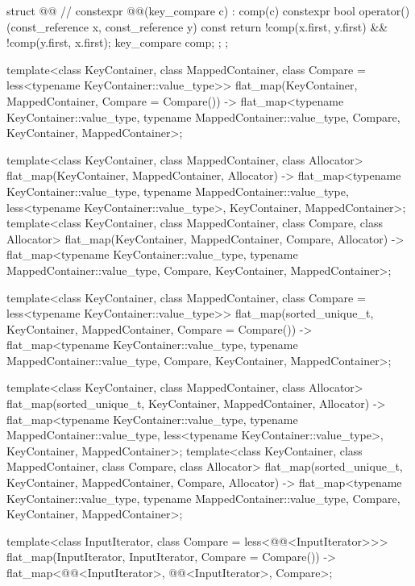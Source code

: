 \begin{codeblock}
{{    struct @@ {  // \expos
      constexpr @@(key_compare c) : comp(c) { }
      constexpr bool operator()(const_reference x, const_reference y) const {
        return !comp(x.first, y.first) && !comp(y.first, x.first);
      }
      key_compare comp;
    };
  };

  template<class KeyContainer, class MappedContainer,
           class Compare = less<typename KeyContainer::value_type>>
    flat_map(KeyContainer, MappedContainer, Compare = Compare())
      -> flat_map<typename KeyContainer::value_type, typename MappedContainer::value_type,
                  Compare, KeyContainer, MappedContainer>;

  template<class KeyContainer, class MappedContainer, class Allocator>
    flat_map(KeyContainer, MappedContainer, Allocator)
      -> flat_map<typename KeyContainer::value_type, typename MappedContainer::value_type,
                  less<typename KeyContainer::value_type>, KeyContainer, MappedContainer>;
  template<class KeyContainer, class MappedContainer, class Compare, class Allocator>
    flat_map(KeyContainer, MappedContainer, Compare, Allocator)
      -> flat_map<typename KeyContainer::value_type, typename MappedContainer::value_type,
                  Compare, KeyContainer, MappedContainer>;

  template<class KeyContainer, class MappedContainer,
           class Compare = less<typename KeyContainer::value_type>>
    flat_map(sorted_unique_t, KeyContainer, MappedContainer, Compare = Compare())
      -> flat_map<typename KeyContainer::value_type, typename MappedContainer::value_type,
                  Compare, KeyContainer, MappedContainer>;

  template<class KeyContainer, class MappedContainer, class Allocator>
    flat_map(sorted_unique_t, KeyContainer, MappedContainer, Allocator)
      -> flat_map<typename KeyContainer::value_type, typename MappedContainer::value_type,
                  less<typename KeyContainer::value_type>, KeyContainer, MappedContainer>;
  template<class KeyContainer, class MappedContainer, class Compare, class Allocator>
    flat_map(sorted_unique_t, KeyContainer, MappedContainer, Compare, Allocator)
      -> flat_map<typename KeyContainer::value_type, typename MappedContainer::value_type,
                  Compare, KeyContainer, MappedContainer>;

  template<class InputIterator, class Compare = less<@@<InputIterator>>>
    flat_map(InputIterator, InputIterator, Compare = Compare())
      -> flat_map<@@<InputIterator>, @@<InputIterator>, Compare>;

}
\end{codeblock}
